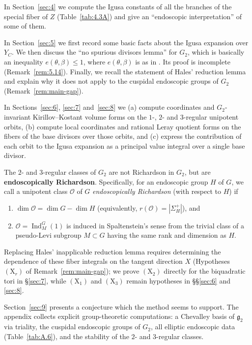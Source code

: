 \documentclass[12pt,letterpaper]{amsart}
\theoremstyle{plain}
\theoremstyle{definition}
\theoremstyle{remark}
\theoremstyle{definition}
\newcommand{\ooo}{\mathcal{O}}
\DeclareMathOperator{\Ind}{Ind}
\begin{document}
In Section~\ref{sec:4} we compute the Igusa constants of all
the branches of the special fiber of $Z$ (Table~\ref{tab:4.3A})
and give an ``endoscopic interpretation'' of some of them.

In Section~\ref{sec:5} we first record some basic facts about
the Igusa expansion over $Y_C$. We then discuss the
``no spurious divisors lemma'' for $G_2$, which is basically an inequality
$e(\theta,\beta)\leq 1$, where $e(\theta,\beta)$ is as in \cite{La83}.
Its proof is incomplete (Remark~\ref{rem:5.14}). Finally, we recall the
statement of Hales' reduction lemma and explain why it does not apply to the
cuspidal endoscopic groups of $G_2$ (Remark~\ref{rem:main-gap}).

In Sections~\ref{sec:6}, \ref{sec:7} and~\ref{sec:8}
we (a) compute coordinates and $G_2$-invariant Kirillov--Kostant volume forms
on the $1$-, $2$- and $3$-regular unipotent orbits, (b) compute local
coordinates and rational Leray quotient forms on the fibers of the base divisors
over those orbits, and (c) express the contribution of each orbit to the
Igusa expansion as a principal value integral over a single base divisor.

The $2$- and $3$-regular classes of $G_2$ are not Richardson in $G_2$, but are
\textbf{endoscopically Richardson}. Specifically, for an endoscopic group $H$
of $G$, we call a unipotent class $\ooo$ of $G$ \emph{endoscopically
Richardson} (with respect to $H$) if
\begin{enumerate}[(1)]
\item $\dim\ooo = \dim G - \dim H$ (equivalently, $r(\ooo) = |\Sigma_H^+|$), and
\item $\ooo = \Ind_M^G(1)$ is induced in Spaltenstein's sense \cite{Spa82} from
the trivial class of a pseudo-Levi subgroup $M\subset G$ having the same rank
and dimension as $H$.
\end{enumerate}
Replacing Hales' inapplicable reduction lemma requires determining the
dependence of these fiber integrals on the tangent direction $X$
(Hypotheses $(\mathrm X_r)$ of Remark~\ref{rem:main-gap}); we prove
$(\mathrm X_2)$ directly for the biquadratic tori in \S\ref{sec:7}, while
$(\mathrm X_1)$ and $(\mathrm X_3)$ remain hypotheses in \S\S\ref{sec:6} and
\ref{sec:8}.

Section~\ref{sec:9} presents a conjecture which the method seems to support.
The appendix collects explicit group-theoretic computations: a Chevalley basis
of ${\mathfrak g}_2$ via triality, the cuspidal endoscopic groups of $G_2$,
all elliptic endoscopic data (Table~\ref{tab:A.6}), and the stability of
the $2$- and $3$-regular classes.
\end{document}
